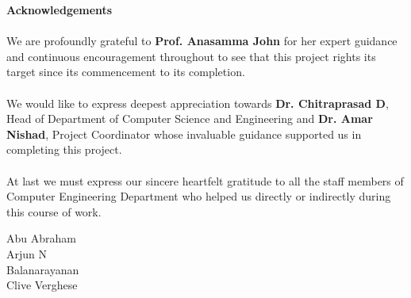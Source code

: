 \begin{center}
\thispagestyle{empty}
\LARGE{\textbf{Acknowledgements}}\\[1cm]
\end{center}
\linespread{1.13}
\large{\paragraph{}We are profoundly grateful to \textbf{Prof. Anasamma John} for her expert guidance
and continuous encouragement throughout to see that this project rights its
target since its commencement to its completion.}
\large{\paragraph{}We would like to express deepest appreciation towards \textbf{Dr. Chitraprasad D}, 
Head of Department of Computer Science and Engineering and \textbf{Dr. Amar Nishad}, Project Coordinator whose
invaluable guidance supported us in completing this project.}
\large{\paragraph{}At last we must express our sincere heartfelt gratitude to all the staff members
of Computer Engineering Department who helped us directly or indirectly during this course of work.}
\begin{flushright}
{
Abu Abraham\\
Arjun N\\
Balanarayanan\\
Clive Verghese
}
\end{flushright}
\newpage
